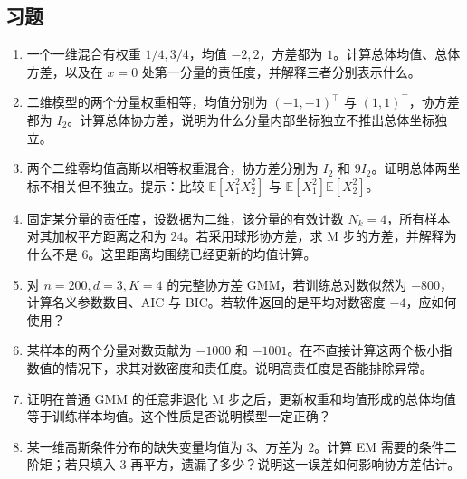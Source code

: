 \documentclass[UTF8,12pt,a4paper,fontset=fandol]{ctexart}
\begin{document}
\subsection{习题}
\begin{enumerate}
\item 一个一维混合有权重 $1/4,3/4$，均值 $-2,2$，方差都为 $1$。计算总体均值、总体方差，以及在 $x=0$ 处第一分量的责任度，并解释三者分别表示什么。
\item 二维模型的两个分量权重相等，均值分别为 $(-1,-1)^\top$ 与 $(1,1)^\top$，协方差都为 $I_2$。计算总体协方差，说明为什么分量内部坐标独立不推出总体坐标独立。
\item 两个二维零均值高斯以相等权重混合，协方差分别为 $I_2$ 和 $9I_2$。证明总体两坐标不相关但不独立。提示：比较 $\mathbb E[X_1^2X_2^2]$ 与 $\mathbb E[X_1^2]\mathbb E[X_2^2]$。
\item 固定某分量的责任度，设数据为二维，该分量的有效计数 $N_k=4$，所有样本对其加权平方距离之和为 $24$。若采用球形协方差，求 M 步的方差，并解释为什么不是 $6$。这里距离均围绕已经更新的均值计算。
\item 对 $n=200,d=3,K=4$ 的完整协方差 GMM，若训练总对数似然为 $-800$，计算名义参数数目、AIC 与 BIC。若软件返回的是平均对数密度 $-4$，应如何使用？
\item 某样本的两个分量对数贡献为 $-1000$ 和 $-1001$。在不直接计算这两个极小指数值的情况下，求其对数密度和责任度。说明高责任度是否能排除异常。
\item 证明在普通 GMM 的任意非退化 M 步之后，更新权重和均值形成的总体均值等于训练样本均值。这个性质是否说明模型一定正确？
\item 某一维高斯条件分布的缺失变量均值为 $3$、方差为 $2$。计算 EM 需要的条件二阶矩；若只填入 $3$ 再平方，遗漏了多少？说明这一误差如何影响协方差估计。
\end{enumerate}
\end{document}
